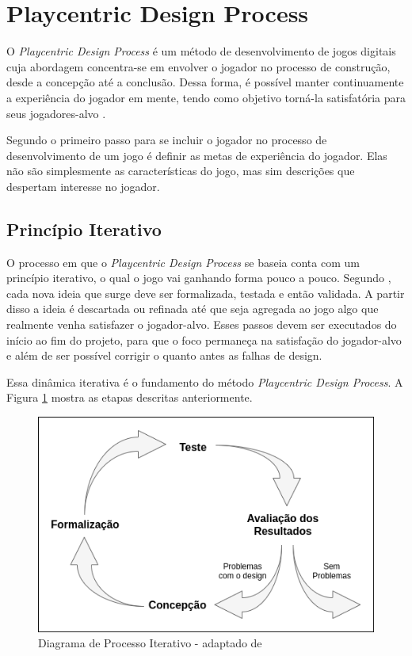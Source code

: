 \section{Playcentric Design Process}
\label{sec:play}

O \textit{Playcentric Design Process} é um método de desenvolvimento de jogos digitais cuja abordagem  concentra-se em envolver o jogador no processo de construção, desde a concepção até a conclusão. Dessa forma, é possível manter continuamente a experiência do jogador em mente, tendo como objetivo torná-la satisfatória para seus jogadores-alvo \cite[p. 10]{Fullerton_2008}. 

Segundo  o primeiro passo para se incluir o jogador no processo de desenvolvimento de um jogo é definir as metas de experiência do jogador. Elas não são simplesmente as características do jogo, mas sim descrições que despertam interesse no jogador. %

\subsection{Princípio Iterativo}

O processo em que o \textit{Playcentric Design Process} se baseia conta com um princípio iterativo, o qual o jogo vai ganhando forma pouco a pouco. Segundo , cada nova ideia que surge deve ser formalizada, testada e então validada. A partir disso a ideia é descartada ou refinada até que seja agregada ao jogo algo que realmente venha satisfazer o jogador-alvo. Esses passos devem ser executados do início ao fim do projeto, para que o foco permaneça na satisfação do jogador-alvo e além de ser possível corrigir o quanto antes as falhas de design. %

Essa dinâmica iterativa é o fundamento do método \textit{Playcentric Design Process}. A Figura \ref{Fig:playcentric_process.png} mostra as etapas descritas anteriormente.
 
\begin{figure}[htbp]
	\centering
		\includegraphics[keepaspectratio=true,scale=0.5]{figuras/playcentrtic_process.png}
	\caption{Diagrama de Processo Iterativo - adaptado de }
	\label{Fig:playcentric_process.png}
\end{figure}


